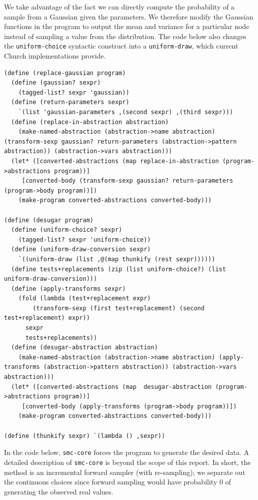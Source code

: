 \documentclass[a4paper,10pt]{article}
\begin{document}
We take advantage of the fact we can directly compute the probability of a sample from a Gaussian given the parameters.  We therefore modify the Gaussian functions in the program to output the mean and variance for a particular node instead of sampling a value from the distribution.  The code below also changes the \texttt{uniform-choice} syntactic construct into a \texttt{uniform-draw}, which current Church implementations provide.
\begin{lstlisting}[frame=trbl]
(define (replace-gaussian program)
  (define (gaussian? sexpr)
    (tagged-list? sexpr 'gaussian))
  (define (return-parameters sexpr)
    `(list 'gaussian-parameters ,(second sexpr) ,(third sexpr)))
  (define (replace-in-abstraction abstraction)
    (make-named-abstraction (abstraction->name abstraction) (transform-sexp gaussian? return-parameters (abstraction->pattern abstraction)) (abstraction->vars abstraction)))
  (let* ([converted-abstractions (map replace-in-abstraction (program->abstractions program))]
	 [converted-body (transform-sexp gaussian? return-parameters (program->body program))])
    (make-program converted-abstractions converted-body)))

(define (desugar program)
  (define (uniform-choice? sexpr)
    (tagged-list? sexpr 'uniform-choice))
  (define (uniform-draw-conversion sexpr)
    `((uniform-draw (list ,@(map thunkify (rest sexpr))))))
  (define tests+replacements (zip (list uniform-choice?) (list uniform-draw-conversion)))
  (define (apply-transforms sexpr)
    (fold (lambda (test+replacement expr)
	    (transform-sexp (first test+replacement) (second test+replacement) expr))
	  sexpr
	  tests+replacements))
  (define (desugar-abstraction abstraction)
    (make-named-abstraction (abstraction->name abstraction) (apply-transforms (abstraction->pattern abstraction)) (abstraction->vars abstraction)))
  (let* ([converted-abstractions (map  desugar-abstraction (program->abstractions program))]
	 [converted-body (apply-transforms (program->body program))])
    (make-program converted-abstractions converted-body)))

(define (thunkify sexpr) `(lambda () ,sexpr))
\end{lstlisting}
In the code below, \texttt{smc-core} forces the program to generate the desired data.  A detailed description of \texttt{smc-core} is beyond the scope of this report. In short, the method is an incremental forward sampler (with re-sampling); we separate out the continuous choices since forward sampling would have probability $0$ of generating the observed real values.
\end{document}
